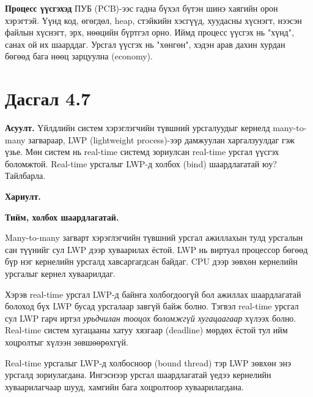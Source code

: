 \documentclass[12pt,a4paper]{article}
\newcommand{\question}[2]{\section{Дасгал #1}\textbf{Асуулт.} #2\par\medskip\textbf{Хариулт.}\par}
\begin{document}
\textbf{Процесс үүсгэхэд} ПУБ (PCB)-ээс гадна бүхэл бүтэн шинэ хаягийн орон хэрэгтэй. Үүнд код, өгөгдөл, heap, стэйкийн хэсгүүд, хуудасны хүснэгт, нээсэн файлын хүснэгт, эрх, нөөцийн бүртгэл орно. Иймд процесс үүсгэх нь "хүнд", санах ой их шаарддаг. Урсгал үүсгэх нь "хөнгөн", хэдэн арав дахин хурдан бөгөөд бага нөөц зарцуулна (economy).

\question{4.7}{Үйлдлийн систем хэрэглэгчийн түвшний урсгалуудыг кернелд many-to-many загвараар, LWP (lightweight process)-ээр дамжуулан харгалзуулдаг гэж үзье. Мөн систем нь real-time системд зориулсан real-time урсгал үүсгэх боломжтой. Real-time урсгалыг LWP-д холбох (bind) шаардлагатай юу? Тайлбарла.}

\textbf{Тийм, холбох шаардлагатай.}

Many-to-many загварт хэрэглэгчийн түвшний урсгал ажиллахын тулд урсгалын сан түүнийг сул LWP дээр хуваарилах ёстой. LWP нь виртуал процессор бөгөөд бүр нэг кернелийн урсгалд хавсаргагдсан байдаг. CPU дээр зөвхөн кернелийн урсгалыг кернел хуваарилдаг.

Хэрэв real-time урсгал LWP-д байнга холбогдоогүй бол ажиллах шаардлагатай болоход бүх LWP бусад урсгалаар завгүй байж болно. Тэгвэл real-time урсгал сул LWP гарч иртэл \emph{урьдчилан тооцох боломжгүй хугацаагаар} хүлээх болно. Real-time систем хугацааны хатуу хязгаар (deadline) мөрдөх ёстой тул ийм хоцролтыг хүлээн зөвшөөрөхгүй.

Real-time урсгалыг LWP-д холбосноор (bound thread) тэр LWP зөвхөн энэ урсгалд зориулагдана. Ингэснээр урсгал шаардлагатай үедээ кернелийн хуваарилагчаар шууд, хамгийн бага хоцролтоор хуваарилагдана.
\end{document}
